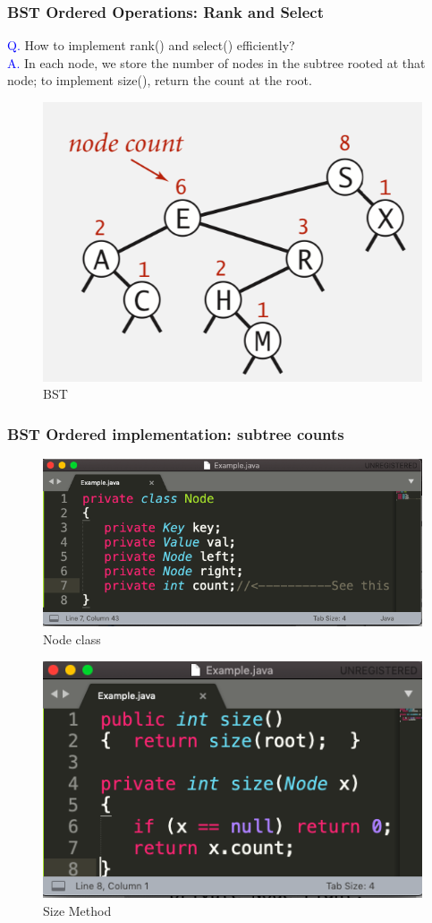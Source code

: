 \documentclass[11pt]{beamer}
\begin{document}
    \begin{frame}[fragile]
   	\frametitle{BST Ordered Operations:  Rank and Select}
    \textcolor{blue}{Q. }How to implement rank() and select() efficiently?\\
    \textcolor{blue}{A. } In each node, we store the number of nodes in the subtree rooted at that node; to implement size(), return the count at the root. 
     \begin{figure}
     	\centering
     	\includegraphics[width=0.6\linewidth]{"Screenshot 2020-11-04 at 9.27.23 AM"}
     	\caption{BST}
     	\label{fig:screenshot-2020-11-04-at-9}
     \end{figure}
   \end{frame}

     \begin{frame}[fragile]
    	\frametitle{BST Ordered implementation: subtree counts}
    	\begin{figure}
    		\centering
    		\includegraphics[width=0.5\linewidth]{"Screenshot 2020-11-04 at 9.38.24 AM"}
    		\caption{Node class}
    		\label{fig:screenshot-2020-11-04-at-9}
    	\end{figure}
    	\begin{figure}
    		\centering
    		\includegraphics[width=0.5\linewidth]{"Screenshot 2020-11-04 at 9.40.05 AM"}
    		\caption{Size Method}
    		\label{fig:screenshot-2020-11-04-at-9}
    	\end{figure}	
    \end{frame}
\end{document}
